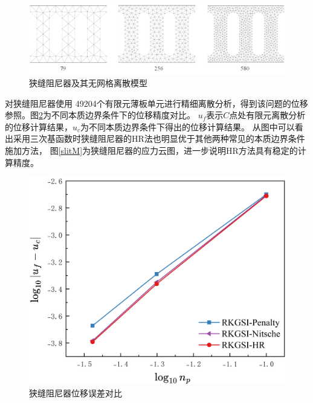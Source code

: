 \newpage
\begin{figure}[H]
    \centering
    \includegraphics[scale=0.65]{figure/DAMPER/SLIT/slit damper_msh.png}
    \caption{狭缝阻尼器及其无网格离散模型}\label{slitmsh}
\end{figure}
对狭缝阻尼器使用 49204个有限元薄板单元进行精细离散分析，得到该问题的位移参照。图\ref{slitx}为不同本质边界条件下的位移精度对比。
$u_f$表示$C$点处有限元离散分析的位移计算结果，$u_c$为不同本质边界条件下得出的位移计算结果。
从图中可以看出采用三次基函数时狭缝阻尼器的HR法也明显优于其他两种常见的本质边界条件施加方法，
图\ref{slitM}为狭缝阻尼器的应力云图，进一步说明HR方法具有稳定的计算精度。
\begin{figure}[H]
    \centering
    \includegraphics[scale=0.5]{figure/DAMPER/SLIT/slit-x.png}
    \caption{狭缝阻尼器位移误差对比}\label{slitx}
\end{figure}
\newpage
